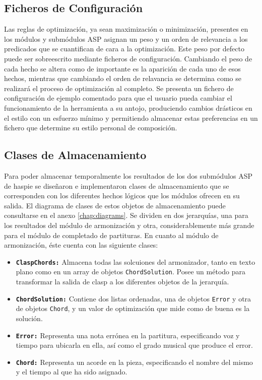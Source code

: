 \subsection{Ficheros de Configuración}
Las reglas de optimización, ya sean maximización o minimización, presentes en los módulos y submódulos ASP asignan un peso y un orden de relevancia a los predicados que se cuantifican de cara a la optimización. Este peso por defecto puede ser sobreescrito mediante ficheros de configuración. Cambiando el peso de cada hecho se altera como de importante es la aparición de cada uno de esos hechos, mientras que cambiando el orden de relavancia se determina como se realizará el proceso de optimización al completo.
Se presenta un fichero de configuración de ejemplo comentado para que el usuario pueda cambiar el funcionamiento de la herramienta a su antojo, produciendo cambios drásticos en el estilo con un esfuerzo mínimo y permitiendo almacenar estas preferencias en un fichero que determine su estilo personal de composición.

\subsection{Clases de Almacenamiento}
\label{subsec:store_classes}
Para poder almacenar temporalmente los resultados de los dos submódulos ASP de haspie se diseñaron e implementaron clases de almacenamiento que se corresponden con los diferentes hechos lógicos que los módulos ofrecen en su salida. El diagrama de clases de estos objetos de almacenamiento puede consultarse en el anexo \ref{chap:diagrams}. Se dividen en dos jerarquías, una para los resultados del módulo de armonización y otra, considerablemente más grande para el módulo de completado de partituras. 
En cuanto al módulo de armonización, éste cuenta con las siguiente clases:
\begin{itemize}
	\item \texttt{\textbf{ClaspChords:}} Almacena todas las solcuiones del armonizador, tanto en texto plano como en un array de objetos \texttt{ChordSolution}. Posee un método para transformar la salida de clasp a los diferentes objetos de la jerarquía.
	\item \texttt{\textbf{ChordSolution:}} Contiene dos listas ordenadas, una de objetos \texttt{Error} y otra de objetos \texttt{Chord}, y un valor de optimización que mide como de buena es la solución.
	\item \texttt{\textbf{Error:}} Representa una nota errónea en la partitura, especificando voz y tiempo para ubicarla en ella, así como el grado musical que produce el error.
	\item \texttt{\textbf{Chord:}} Representa un acorde en la pieza, especificando el nombre del mismo y el tiempo al que ha sido asignado.
\end{itemize}

